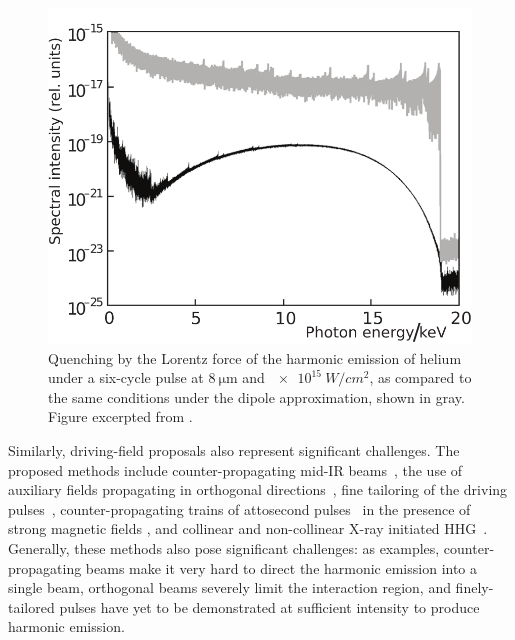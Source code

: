 \begin{figure}[t!]
  \centering
  \includegraphics[scale=1.15]{9-Nondipole-HHG/Figures/figure9A.png}
  \caption[
  Damping of HHG emission by the Lorentz force at $\SI{8}{\micro\meter}$ and $\SI{e15}{W/cm^2}$, by several orders of magnitude with respect to the dipole-approximation ideal, as calculated by A.S. Emelina~et~al.
  ]{
  Quenching by the Lorentz force of the harmonic emission of helium under a six-cycle pulse at $\SI{8}{\micro\meter}$ and $\SI{e15}{W/cm^2}$, as compared to the same conditions under the dipole approximation, shown in gray.
  Figure excerpted from .
  }
\label{f6-emelina-original-spectrum}
\end{figure}




Similarly, driving-field proposals also represent significant challenges. The proposed methods include 
%
counter-propagating mid-IR beams~\cite{ taranukhin_relativistic_2000, taranukhin_high-order_2002, milosevic_lasers-attosecond-nuclear_2004, verschl_relativistic_2007,verschl_consecutive-laser-pulses_2007}, 
%
the use of auxiliary fields propagating in orthogonal directions~\cite{ chirila_nondipole_2002}, 
%
fine tailoring of the driving pulses~\cite{klaiber_relativistic_2006, klaiber_fully_2007,liu_laser-guided_2009}, 
%
coun\-ter-propagating trains of attosecond pulses~\cite{ hatsagortsyan_laser_driven_2008, kohler_phase-matched_2011} 
in the presence of strong magnetic fields \cite{verschl_refocussed_2007}, 
%
and collinear and non-collinear X-ray initiated HHG~\cite{klaiber_coherent_2008, kohler_macroscopic_2012}. 
%
Generally, these methods also pose significant challenges: as examples, counter-propagating beams make it very hard to direct the harmonic emission into a single beam, orthogonal beams severely limit the interaction region, and finely-tailored pulses have yet to be demonstrated at sufficient intensity to produce harmonic emission. 

